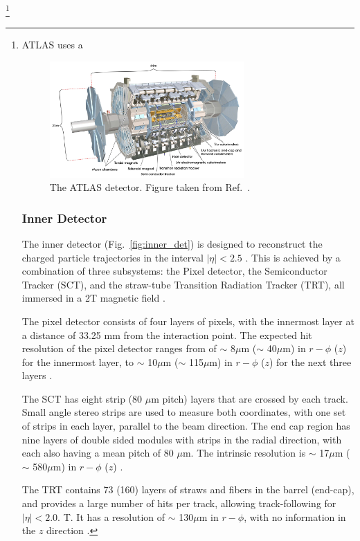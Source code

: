 \footnote{
ATLAS uses a 

\begin{figure}[ht]
	\centering
	\includegraphics[width=0.7\textwidth]{figures/atlas.pdf} %
	\caption{The ATLAS detector. Figure taken from Ref.~\cite{Aad:2008zzm}.}	
	\label{fig:atlas}%
\end{figure}


\subsubsection{Inner Detector}
The inner detector (Fig.~\ref{fig:inner_det}) is designed to reconstruct the charged particle trajectories in the interval $|\eta| < 2.5$ . This is achieved by a combination of three subsystems: the Pixel detector, the Semiconductor Tracker (SCT), and the straw-tube Transition Radiation Tracker (TRT), all immersed in a 2T magnetic field \cite{Aad:2008zzm}.

The pixel detector consists of four layers of pixels, with the innermost layer at a distance of 33.25 mm from the interaction point. The expected hit resolution of the pixel detector ranges from of $\sim$ 8$\mu$m ($\sim$ 40$\mu$m) in $r-\phi$ ($z$) \cite{ibl_design} for the innermost layer, to $\sim$ 10$\mu$m ($\sim$ 115$\mu$m) in $r-\phi$ ($z$) for the next three layers \cite{Aad:2008zzm}.

The SCT has eight strip (80 $\mu$m pitch) layers that are crossed by each track. Small angle stereo strips are used to measure both coordinates, with one set of strips in each layer, parallel to the beam direction. The end cap region has nine layers of double sided modules with strips in the radial direction, with each also having a mean pitch of 80 $\mu$m. The intrinsic resolution is $\sim$ 17$\mu$m ($\sim$ 580$\mu$m) in $r-\phi$ ($z$)  \cite{Aad:2008zzm}.

The TRT contains 73 (160) layers of straws and fibers in the barrel (end-cap), and provides a large number of hits per track, allowing track-following for $|\eta| <  2.0$. T. It has a resolution of $\sim$ 130$\mu$m in $r-\phi$, with no information in the $z$ direction \cite{Aad:2008zzm}.

}
